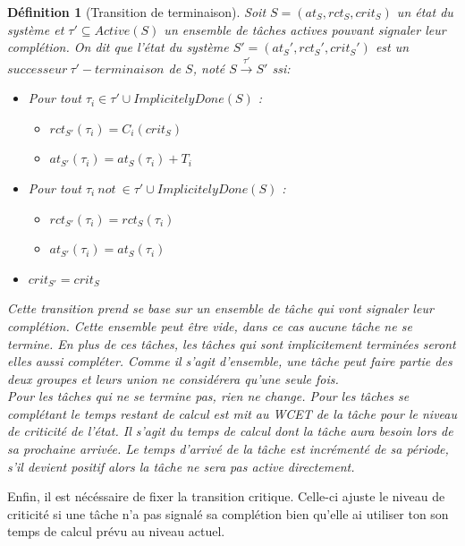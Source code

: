 \documentclass[12pt,a4paper,oneside]{book}
\theoremstyle{break}
\newtheorem{defin}{Définition}[chapter]
\theoremstyle{breakplain}
\begin{document}
\begin{defin}[Transition de terminaison]
Soit $S = (at_S, rct_S, crit_S)$ un état du système et $\tau' \subseteq Active(S)$ un ensemble de tâches actives pouvant signaler leur complétion. On dit que l'état du système $S' = (at_S', rct_S', crit_S')$ est un $successeur\ \tau'-terminaison$ de $S$, noté $S\xrightarrow{\tau'}S'$ ssi:
\begin{itemize}
\item Pour tout $\tau_i \in \tau' \cup ImplicitelyDone(S)$ :\begin{itemize}
\item $rct_{S'}(\tau_i) = C_i(crit_S)$
\item $at_{S'}(\tau_i) = at_{S}(\tau_i)+T_i$
\end{itemize}

\item Pour tout $\tau_i\ not\ \in \tau' \cup ImplicitelyDone(S)$ :\begin{itemize}
\item $rct_{S'}(\tau_i) = rct_{S}(\tau_i)$
\item $at_{S'}(\tau_i) = at_{S}(\tau_i)$
\end{itemize}
\item $crit_{S'} = crit_{S}$

\end{itemize}
Cette transition prend se base sur un ensemble de tâche qui vont signaler leur complétion. Cette ensemble peut être vide, dans ce cas aucune tâche ne se termine. En plus de ces tâches, les tâches qui sont implicitement terminées seront elles aussi compléter. Comme il s'agit d'ensemble, une tâche peut faire partie des deux groupes et leurs union ne considérera qu'une seule fois.\\

Pour les tâches qui ne se termine pas, rien ne change. Pour les tâches se complétant le temps restant de calcul est mit au WCET de la tâche pour le niveau de criticité de l'état. Il s'agit du temps de calcul dont la tâche aura besoin lors de sa prochaine arrivée. Le temps d'arrivé de la tâche est incrémenté de sa période, s'il devient positif alors la tâche ne sera pas active directement.
\end{defin}

Enfin, il est nécéssaire de fixer la transition critique. Celle-ci ajuste le niveau de criticité si une tâche n'a pas signalé sa complétion bien qu'elle ai utiliser ton son temps de calcul prévu au niveau actuel.
\end{document}
